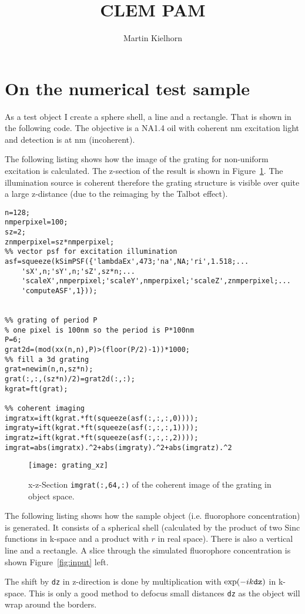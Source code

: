 \documentclass[11pt,abstracton,titlepage]{scrartcl}
\title{CLEM PAM}
\author{Martin Kielhorn}
\newcommand{\figref}[1]{Figure~\ref{#1}}
\begin{document}
\section{On the numerical test sample}


As a test object I create a sphere shell, a line and a rectangle.
That is shown in the following code.  The objective is a NA1.4 oil
with coherent \unit[473]{nm} excitation light and detection is at
\unit[520]{nm} (incoherent).

The following listing shows how the image of the grating for
non-uniform excitation is calculated. The z-section of the result is
shown in \figref{fig:grating}. The illumination source is coherent
therefore the grating structure is visible over quite a large
z-distance (due to the reimaging by the Talbot effect).


\begin{lstlisting}
n=128;
nmperpixel=100;
sz=2;
znmperpixel=sz*nmperpixel;
%% vector psf for excitation illumination
asf=squeeze(kSimPSF({'lambdaEx',473;'na',NA;'ri',1.518;...
    'sX',n;'sY',n;'sZ',sz*n;...
    'scaleX',nmperpixel;'scaleY',nmperpixel;'scaleZ',znmperpixel;...
    'computeASF',1}));


%% grating of period P
% one pixel is 100nm so the period is P*100nm
P=6;
grat2d=(mod(xx(n,n),P)>(floor(P/2)-1))*1000;
%% fill a 3d grating
grat=newim(n,n,sz*n);
grat(:,:,(sz*n)/2)=grat2d(:,:);
kgrat=ft(grat);

%% coherent imaging
imgratx=ift(kgrat.*ft(squeeze(asf(:,:,:,0))));
imgraty=ift(kgrat.*ft(squeeze(asf(:,:,:,1))));
imgratz=ift(kgrat.*ft(squeeze(asf(:,:,:,2))));
imgrat=abs(imgratx).^2+abs(imgraty).^2+abs(imgratz).^2
\end{lstlisting}

\begin{figure}[htb]
  \centering
  \texttt{[image: grating\_xz]}

  \caption{x-z-Section {\tt imgrat(:,64,:)} of the coherent
    image of the grating in object space.}
  \label{fig:grating}
\end{figure}

The following listing shows how the sample object (i.e. fluorophore
concentration) is generated.  It consists of a spherical shell
(calculated by the product of two Sinc functions in k-space and a
product with $r$ in real space). There is also a vertical line and a
rectangle. A slice through the simulated fluorophore concentration is
shown \figref{fig:input} left.

The shift by {\tt dz} in z-direction is done by multiplication with
$\exp(-ik{\tt dz})$ in k-space. This is only a good method to defocus
small distances {\tt dz} as the object will wrap around the borders.
\end{document}
